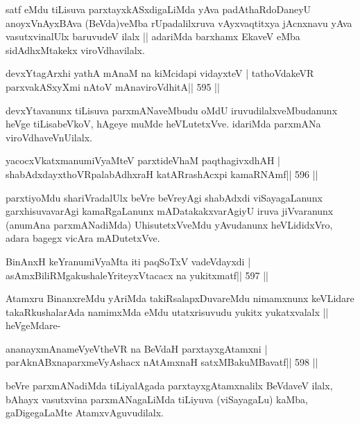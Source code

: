 \begin{artha}
satf eMdu tiLisuva parxtayxkASxdigaLiMda yAva padAthaRdoDaneyU anoyxVnAyxBAva (BeVda)veMba rUpadalilxruva vAyxvaqtitxya jAcnxnavu yAva vasutxvinalUlx baruvudeV ilalx ||  adariMda barxhamx EkaveV eMba sidAdhxMtakekx viroVdhavilalx.
\end{artha}

\begin{shl}
devxYtagArxhi yathA mAnaM na kiMcidapi vidayxteV |
tathoVdakeVR parxvakASxyXmi nAtoV mAnaviroVdhitA\hfill || 595 ||
\end{shl}

\begin{artha}
devxYtavanunx tiLisuva parxmANaveMbudu oMdU iruvudilalxveMbudanunx heVge tiLisabeVkoV, hAgeye muMde heVLutetxVve. idariMda parxmANa viroVdhaveVnUilalx.
\end{artha}

\begin{shl}
yacocxVkatxmanumiVyaMteV parxtideVhaM paqthagivxdhAH |
shabAdxdayxthoVRpalabAdhxraH katARrashAcxpi kamaRNAmf\hfill || 596 ||
\end{shl}

\begin{artha}
parxtiyoMdu shariVradalUlx beVre beVreyAgi shabAdxdi viSayagaLanunx
garxhisuvavarAgi kamaRgaLanunx mADatakakxvarAgiyU iruva jiVvaranunx
(anumAna parxmANadiMda) UhisutetxVveMdu yAvudanunx heVLididxVro, adara
bagegx vicAra mADutetxVve.
\end{artha}

\begin{shl}
BinAnxH keYranumiVyaMta iti paqSoTxV vadeVdayxdi |
asAmxBiliRMgakushaleYriteyxVtacacx na yukitxmatf\hfill || 597 ||
\end{shl}

\begin{artha}
Atamxru BinanxreMdu yAriMda takiRsalapxDuvareMdu nimamxnunx keVLidare
takaRkushalarAda namimxMda eMdu utatxrisuvudu yukitx yukatxvalalx ||
heVgeMdare-
\end{artha}

\begin{shl}
ananayxmAnameVyeV\s theVR na BeVdaH parxtayxgAtamxni |
parAknABxnaparxmeVyAshacx nA\s\s tAmxnaH satxMBakuMBavatf\hfill || 598 ||
\end{shl}

\begin{artha}
beVre parxmANadiMda tiLiyalAgada parxtayxgAtamxnalilx BeVdaveV ilalx, bAhayx vasutxvina parxmANagaLiMda tiLiyuva (viSayagaLu) kaMba, gaDigegaLaMte AtamxvAguvudilalx.
\end{artha}

